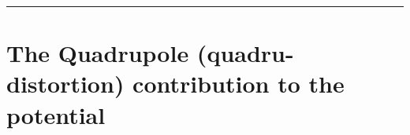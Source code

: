\documentclass{article}
\begin{document}
\begin{comment}
Substituting \cref{eq:DrDr-dipole-third-order-tensor-term-projection-species} into \cref{eq:DrDr-dipole-distortion-term-species}:
\begin{equation}
\label{eq:DrDr-dipole-distortion-term-species}
\begin{split}
    \left[\text{D}_{\gls{distance-vec}} \text{D}_{\gls{distance-vec}}\gls{di-distortion}_{term}\right]^{Mg}_{H}\ =\ \sum_{i \in I_{Mg}} &\left[\text{D}^3_{\gls{distance-vec}}\gls{di-distortion}_i \cdot \gls{di-distortion}_i\right]^{Mg}_{H}\ +\ \left[\text{D}_{\gls{distance-vec}}\gls{di-distortion}_i\right]^{Mg}_{H}\ \left[\text{D}^T_{\gls{distance-vec}}\gls{di-distortion}_i\right]^{Mg}_{H} \\ 
    +\ \sum_{i \in I_{H}} &\gls{molar-fraction}_i \left[\text{D}^3_{\gls{distance-vec}}\gls{di-distortion}_i \cdot \gls{molar-fraction}_i\gls{di-distortion}_i\right]^{Mg}_{H}\ +\  \gls{molar-fraction}_i \left[\text{D}_{\gls{distance-vec}}\gls{di-distortion}_i\right]^{Mg}_{H}\ \gls{molar-fraction}_i\left[\text{D}^T_{\gls{distance-vec}}\gls{di-distortion}_i\right]^{Mg}_{H}    
\end{split}
\end{equation}
\end{comment}

\vspace{0.5cm}
\hrule
\vspace{0.5cm}

\section{The Quadrupole (\gls{quadru-distortion}) contribution to the potential}
\end{document}
